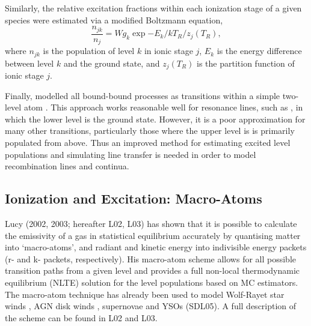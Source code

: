 \documentclass[preprint, a4paper, 11pt]{aastex}
\begin{document}
Similarly, the relative excitation fractions within each ionization
stage of a given species were estimated via a modified Boltzmann
equation,
\begin{equation}
\frac{n_{jk}}{n_j} = W g_k \exp{-E_k/kT_R} / z_j(T_R),
\end{equation}
where $n_{jk}$ is the population of level $k$ in ionic stage $j$,
$E_k$ is the energy difference between level $k$ and the ground state,
and $z_j(T_R)$ is the partition function of ionic stage $j$. 

Finally, \py modelled all bound-bound processes as transitions
within a simple two-level atom \cite[see e.g.][]{mihalas}. This
approach works reasonable well for resonance  
lines, such as \civfull, in which the lower level is the ground state.  
However, it is a poor approximation for many other
transitions, particularly those where the upper level is 
is primarily populated from above. Thus an improved method for
estimating excited level populations and simulating line transfer is
needed in order to model recombination lines and continua.

\subsection{Ionization and Excitation: Macro-Atoms}

Lucy (2002, 2003\nocite{lucy2002, lucy2003}; hereafter L02, L03) 
has shown that it is possible to calculate the emissivity of a gas in
statistical equilibrium accurately by quantising matter into
`macro-atoms', and radiant and kinetic energy into indivisible energy
packets (r- and k- packets, respectively). His macro-atom scheme
allows for all possible transition paths from a given level and
provides a full non-local thermodynamic equilibrium (NLTE) solution
for the level populations based on MC estimators. The macro-atom
technique has already been used to model Wolf-Rayet star
winds \citep{sim2004}, AGN disk winds \citep{simlong2008, tatum2012},
supernovae \citep{kasen2006, kerzendorfsim} and YSOs (SDL05). A full 
description of the scheme can be found in L02 and L03. 
\end{document}
